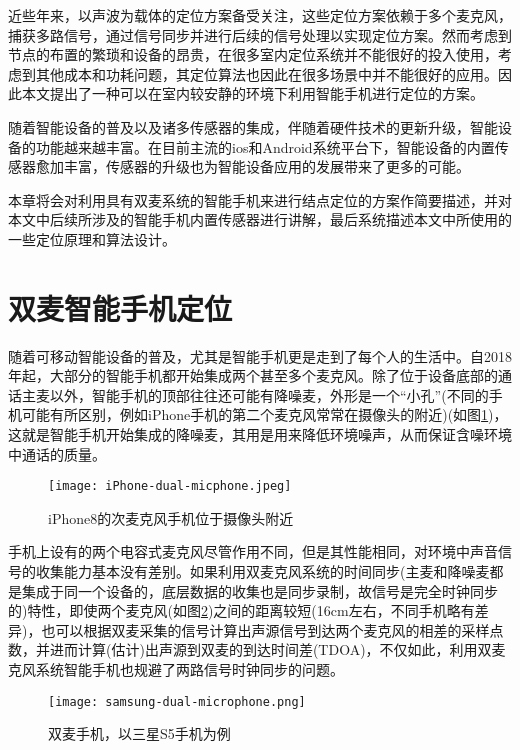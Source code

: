 \documentclass[winfonts,oneside]{njuthesis}
\begin{document}
	近些年来，以声波为载体的定位方案备受关注，这些定位方案依赖于多个麦克风，捕获多路信号，通过信号同步并进行后续的信号处理以实现定位方案。然而考虑到节点的布置的繁琐和设备的昂贵，在很多室内定位系统并不能很好的投入使用，考虑到其他成本和功耗问题，其定位算法也因此在很多场景中并不能很好的应用。因此本文提出了一种可以在室内较安静的环境下利用智能手机进行定位的方案。
	
	随着智能设备的普及以及诸多传感器的集成，伴随着硬件技术的更新升级，智能设备的功能越来越丰富。在目前主流的ios和Android系统平台下，智能设备的内置传感器愈加丰富，传感器的升级也为智能设备应用的发展带来了更多的可能。

	本章将会对利用具有双麦系统的智能手机来进行结点定位的方案作简要描述，并对本文中后续所涉及的智能手机内置传感器进行讲解，最后系统描述本文中所使用的一些定位原理和算法设计。

	\section{双麦智能手机定位}
	
	随着可移动智能设备的普及，尤其是智能手机更是走到了每个人的生活中。自2018年起，大部分的智能手机都开始集成两个甚至多个麦克风。除了位于设备底部的通话主麦以外，智能手机的顶部往往还可能有降噪麦，外形是一个“小孔”(不同的手机可能有所区别，例如iPhone手机的第二个麦克风常常在摄像头的附近)(如图\ref{fig: iphone-dual-microphone})，这就是智能手机开始集成的降噪麦，其用是用来降低环境噪声，从而保证含噪环境中通话的质量。
	
	\begin{figure}[H]
		\centering
		\texttt{[image: iPhone-dual-micphone.jpeg]} 
		\caption{iPhone8的次麦克风手机位于摄像头附近}
		\label{fig: iphone-dual-microphone}
	\end{figure}
	
	手机上设有的两个电容式麦克风尽管作用不同，但是其性能相同，对环境中声音信号的收集能力基本没有差别。如果利用双麦克风系统的时间同步(主麦和降噪麦都是集成于同一个设备的，底层数据的收集也是同步录制，故信号是完全时钟同步的)特性，即使两个麦克风(如图\ref{fig: samsung-dual-microphone})之间的距离较短(16cm左右，不同手机略有差异)，也可以根据双麦采集的信号计算出声源信号到达两个麦克风的相差的采样点数，并进而计算(估计)出声源到双麦的到达时间差(TDOA)，不仅如此，利用双麦克风系统智能手机也规避了两路信号时钟同步的问题。
	
	\begin{figure}[H]
		\centering
		\texttt{[image: samsung-dual-microphone.png]} 
		\caption{双麦手机，以三星S5手机为例}
		\label{fig: samsung-dual-microphone}
	\end{figure}
	
\end{document}
